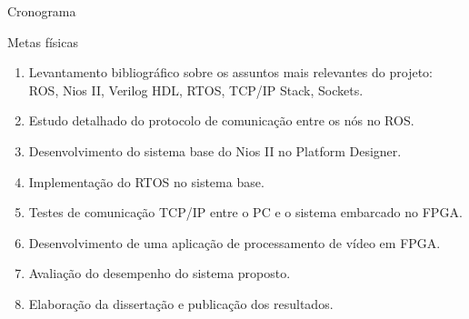 \documentclass[10pt]{beamer}
\begin{document}
{
\begin{frame}{Cronograma}
	\begin{alertblock}{Metas físicas}
        \begin{enumerate}[1.]
        	\item Levantamento bibliográfico sobre os assuntos mais relevantes do projeto: ROS, Nios II, Verilog HDL, RTOS, TCP/IP Stack, Sockets.
        	\item Estudo detalhado do protocolo de comunicação entre os nós no ROS.
        	\item Desenvolvimento do sistema base do Nios II no Platform Designer.
        	\item Implementação do RTOS no sistema base.
        	\item Testes de comunicação TCP/IP entre o PC e o sistema embarcado no FPGA.
        	\item Desenvolvimento de uma aplicação de processamento de vídeo em FPGA.
        	\item Avaliação do desempenho do sistema proposto.
        	\item Elaboração da dissertação e publicação dos resultados.
        \end{enumerate}
	\end{alertblock}
\end{frame}
}
\end{document}
